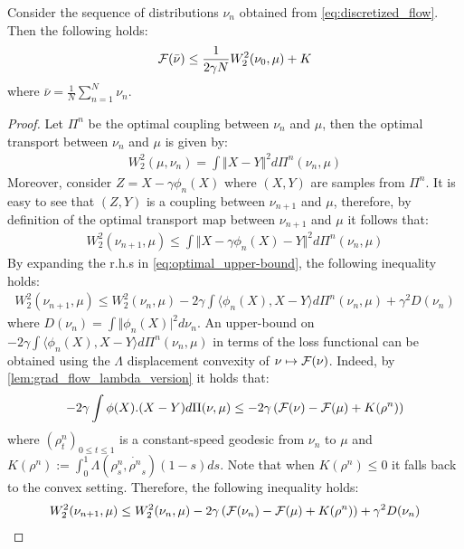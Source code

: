 \begin{theorem}\label{th:rates_mmd}
	Consider the sequence of distributions $\nu_n$ obtained from \cref{eq:discretized_flow}. Then the following holds:
	\begin{align}
		{{\mathcal F}}(\bar{\nu})\leq \frac{1}{2\gamma N}W_2^2(\nu_0,\mu) +K
	\end{align}
	where $\bar{\nu}=\frac{1}{N}\sum_{n=1}^N \nu_n$.
\end{theorem}
\begin{proof}
Let $\Pi^n$ be the optimal coupling between $\nu_n$ and $\mu$, then the optimal transport between $\nu_n$ and $\mu$ is given by:
\begin{align}
	W_2^2(\mu,\nu_n)=\int \Vert X-Y \Vert^2 d\Pi^n(\nu_n,\mu)
\end{align}
Moreover, consider $Z=X-\gamma \phi_n(X)$ where $(X,Y)$ are samples from $\Pi^n$. It is easy to see that $(Z,Y)$ is a coupling between $\nu_{n+1}$ and $\mu$, therefore, by definition of the optimal transport map between $\nu_{n+1}$ and $\mu$ it follows that:
\begin{align}\label{eq:optimal_upper-bound}
	W_2^2(\nu_{n+1},\mu)\leq \int \Vert X-\gamma \phi_{n}(X)-Y\Vert^2 d\Pi^n(\nu_n,\mu)
\end{align}
By expanding the r.h.s in \cref{eq:optimal_upper-bound}, the following inequality holds:
\begin{align}\label{eq:main_inequality}
	W_2^2(\nu_{n+1},\mu)\leq W_2^2(\nu_{n},\mu) -2\gamma \int \langle \phi_n(X), X-Y \rangle d\Pi^n(\nu_n,\mu)+ \gamma^2D(\nu_n)
\end{align}
where $D(\nu_n) = \int \Vert \phi_n(X)\vert^2 d\nu_n $.
An upper-bound on $-2\gamma \int \langle \phi_n(X), X-Y \rangle d\Pi^n(\nu_n,\mu) $ in terms of the loss functional can be obtained using the $\Lambda$ displacement convexity of $\nu\mapsto {{\mathcal F}}(\nu)$. Indeed, by \cref{lem:grad_flow_lambda_version} it holds that:
\begin{align}\label{eq:flow_upper-bound}
	-2\gamma \int  \phi(X).(X-Y) d\Pi(\nu,\mu)
	\leq
	-2\gamma\left({{\mathcal F}}(\nu)- {{\mathcal F}}(\mu) +K(\rho^n)\right)
\end{align}
where $(\rho^n_t)_{0\leq t \leq 1}$ is a constant-speed geodesic from $\nu_n$ to $\mu$ and $K(\rho^n):=\int_0^1 \Lambda(\rho^n_s,\dot{\rho^n}_s)(1-s)ds$. Note that when $K(\rho^n)\leq 0$ it falls back to the convex setting.
Therefore, the following inequality holds:
\begin{align}
	W_2^2(\nu_{n+1},\mu)\leq W_2^2(\nu_{n},\mu) - 2\gamma\left(\F(\nu_n)- \F(\mu) +K(\rho^n)\right) +\gamma^2 D(\nu_n)

\end{align}
\end{proof}
